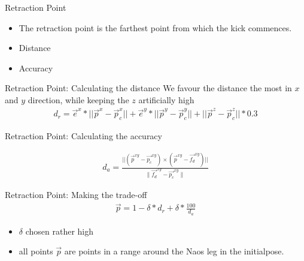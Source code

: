 \documentclass{beamer}
\begin{document}
\begin{frame}{Retraction Point} 
    \begin{itemize}
        \item      The retraction point is the farthest point from which the kick commences.
        \item      Distance
        \item      Accuracy
    \end{itemize}
\end{frame}


\begin{frame}{Retraction Point: Calculating the distance} 
    We favour the distance the most in $x$ and $y$ direction, while keeping the
    $z$ artificially high
        \begin{align}
            d_r = \vec{e}^{x} * || \vec{p}^{x} -\vec{p}_{c}^{x}|| + \vec{e}^y *
        ||\vec{p}^{y} - \vec{p}_{c}^y|| +  ||
     \vec{p}^z - \vec{p}_{c}^z|| * 0.3
        \end{align}
\end{frame}

\begin{frame}{Retraction Point: Calculating the accuracy}
    
\begin{figure}
  \resizebox{\textwidth}{!} {
    }
    \label{fig:accuracy}
\end{figure}    
\begin{align*}
    d_a = \frac{||(\vec{p}^{xy} -\vec{p_c}^{xy}) \times (\vec{p}^{xy} -
    \vec{f_d}^{xy})||}{\|\vec{f_d}^{xy}- \vec{p_c}^{xy}\|}
\end{align*}
\end{frame}


\begin{frame}{Retraction Point: Making the trade-off}
\begin{align*}
    \vec{p} = 1-\delta * d_r + \delta * \frac{100}{d_a}
\end{align*}

\begin{itemize}
    \item $\delta$ chosen rather high
    \item all points $\vec{p}$ are points in a range around the Naos leg in
        the initialpose. 
\end{itemize}
\end{frame}
\end{document}
